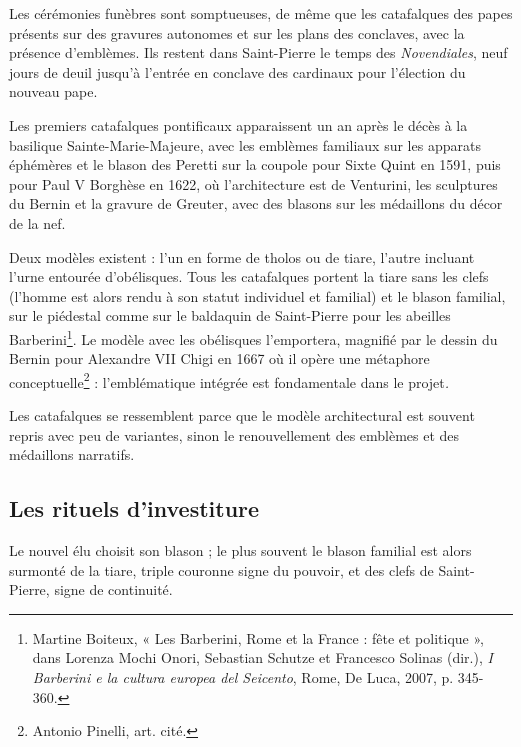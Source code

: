 \documentclass[12pt,twoside,openany]{book}
\begin{document}
Les cérémonies funèbres sont somptueuses, de même que les catafalques des papes présents sur des gravures autonomes et sur les plans des conclaves, avec la présence d’emblèmes. Ils restent dans Saint-Pierre le temps des \textit{Novendiales}, neuf jours de deuil jusqu’à l’entrée en conclave des cardinaux pour l’élection du nouveau pape.

Les premiers catafalques pontificaux apparaissent un an après le décès à la basilique Sainte-Marie-Majeure, avec les emblèmes familiaux sur les apparats éphémères et le blason des Peretti sur la coupole pour Sixte Quint en 1591, puis pour Paul V Borghèse en 1622, où l’architecture est de Venturini, les sculptures du Bernin et la gravure de Greuter, avec des blasons sur les médaillons du décor de la nef.

Deux modèles existent : l’un en forme de tholos ou de tiare, l’autre incluant l’urne entourée d’obélisques. Tous les catafalques portent la tiare sans les clefs (l’homme est alors rendu à son statut individuel et familial) et le blason familial, sur le piédestal comme sur le baldaquin de Saint-Pierre pour les abeilles Barberini\footnote{Martine Boiteux, « Les Barberini, Rome et la France : fête et politique », dans Lorenza Mochi Onori, Sebastian Schutze et Francesco Solinas (dir.), \textit{I Barberini e la cultura europea del Seicento}, Rome, De Luca, 2007, p. 345-360.}. Le modèle avec les obélisques l’emportera, magnifié par le dessin du Bernin pour Alexandre VII Chigi en 1667 où il opère une métaphore conceptuelle\footnote{Antonio Pinelli, art. cité.} : l’emblématique intégrée est fondamentale dans le projet\textit{.}

Les catafalques se ressemblent parce que le modèle architectural est souvent repris avec peu de variantes, sinon le renouvellement des emblèmes et des médaillons narratifs.

\subsection{Les rituels d’investiture}

Le nouvel élu choisit son blason ; le plus souvent le blason familial est alors surmonté de la tiare, triple couronne signe du pouvoir, et des clefs de Saint-Pierre, signe de continuité.
\end{document}
